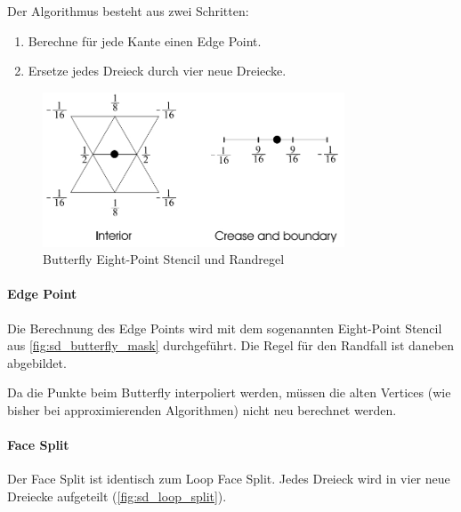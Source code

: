 Der Algorithmus besteht aus zwei Schritten:
\begin{enumerate}
\item Berechne für jede Kante einen Edge Point.
\item Ersetze jedes Dreieck durch vier neue Dreiecke.
\end{enumerate}

\begin{figure}
\centering
\includegraphics[width=0.8\textwidth]{content/media/sd_butterfly_mask.jpg}
\caption{Butterfly Eight-Point Stencil und Randregel \cite{Seeger01asub-atomic}}
\label{fig:sd_butterfly_mask}
\end{figure}

\paragraph*{Edge Point}
Die Berechnung des Edge Points wird mit dem sogenannten Eight-Point Stencil
aus \autoref{fig:sd_butterfly_mask} durchgeführt.
Die Regel für den Randfall ist daneben abgebildet.


Da die Punkte beim Butterfly interpoliert werden, müssen die alten Vertices
(wie bisher bei approximierenden Algorithmen) nicht neu berechnet werden. 

\paragraph*{Face Split}
Der Face Split ist identisch zum Loop Face Split.
Jedes Dreieck wird in vier neue Dreiecke aufgeteilt (\autoref{fig:sd_loop_split}).
\cite[S. 64 ff.]{Standford.24.07.2015} \cite[S. 72 ff.]{Zorin.subdivcourse}
\cite{Seeger01asub-atomic}
\cite{Gamasutra}
\cite{Sharp}
\cite{Zorin:1996:ISM:237170.237254}